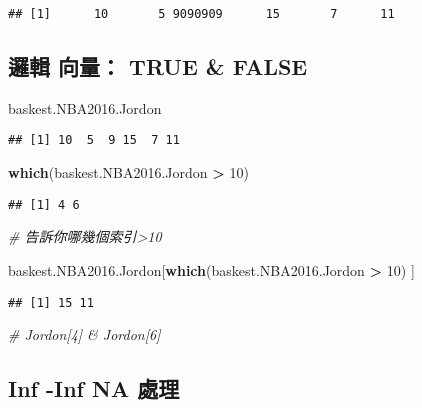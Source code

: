 \documentclass[]{article}
\newenvironment{Shaded}{\begin{snugshade}}{\end{snugshade}}
\newcommand{\CommentTok}[1]{\textcolor[rgb]{0.56,0.35,0.01}{\textit{#1}}}
\newcommand{\DecValTok}[1]{\textcolor[rgb]{0.00,0.00,0.81}{#1}}
\newcommand{\KeywordTok}[1]{\textcolor[rgb]{0.13,0.29,0.53}{\textbf{#1}}}
\newcommand{\NormalTok}[1]{#1}
\newcommand{\OperatorTok}[1]{\textcolor[rgb]{0.81,0.36,0.00}{\textbf{#1}}}
\newcommand{\StringTok}[1]{\textcolor[rgb]{0.31,0.60,0.02}{#1}}
\begin{document}
\begin{verbatim}
## [1]      10       5 9090909      15       7      11
\end{verbatim}

\hypertarget{ux908fux8f2f-ux5411ux91cf-true-false}{%
\subsection{邏輯 向量： TRUE \&
FALSE}\label{ux908fux8f2f-ux5411ux91cf-true-false}}

\begin{Shaded}
\begin{Highlighting}[]
\NormalTok{baskest.NBA2016.Jordon}
\end{Highlighting}
\end{Shaded}

\begin{verbatim}
## [1] 10  5  9 15  7 11
\end{verbatim}

\begin{Shaded}
\begin{Highlighting}[]
\KeywordTok{which}\NormalTok{(baskest.NBA2016.Jordon }\OperatorTok{>}\StringTok{ }\DecValTok{10}\NormalTok{) }
\end{Highlighting}
\end{Shaded}

\begin{verbatim}
## [1] 4 6
\end{verbatim}

\begin{Shaded}
\begin{Highlighting}[]
\CommentTok{# 告訴你哪幾個索引>10}

\NormalTok{baskest.NBA2016.Jordon[}\KeywordTok{which}\NormalTok{(baskest.NBA2016.Jordon }\OperatorTok{>}\StringTok{ }\DecValTok{10}\NormalTok{) ] }
\end{Highlighting}
\end{Shaded}

\begin{verbatim}
## [1] 15 11
\end{verbatim}

\begin{Shaded}
\begin{Highlighting}[]
\CommentTok{# Jordon[4] & Jordon[6]}
\end{Highlighting}
\end{Shaded}

\hypertarget{inf--inf-na-ux8655ux7406}{%
\subsection{Inf -Inf NA 處理}\label{inf--inf-na-ux8655ux7406}}
\end{document}
